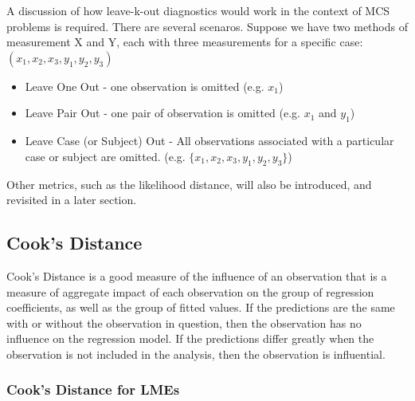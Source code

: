 \documentclass[12pt, a4paper]{report}
\theoremstyle{plain}
\theoremstyle{definition}
\theoremstyle{remark}
\begin{document}
A discussion of how leave-k-out diagnostics would work in the context of MCS problems is required. There are several scenaros. Suppose we have two methods of measurement X and Y, each with three measurements for a specific case: $(x_1,x_2,x_3,y_1,y_2,y_3)$
	
	\begin{itemize}
		\item Leave One Out - one observation is omitted (e.g. $x_1$)
		\item Leave Pair Out - one pair of observation  is omitted (e.g. $x_1$ and $y_1$)
		\item Leave Case (or Subject) Out - All observations associated with a particular case or subject are omitted. (e.g. $\{x_1,x_2,x_3,y_1,y_2,y_3\}$)
	\end{itemize}
	Other metrics, such as the likelihood distance, will also be introduced, and revisited in a later section.
	
	


	\subsection{Cook's Distance}
	
	Cook's Distance is a good measure of the influence of an observation that is a measure of aggregate impact of each observation on the group of regression coefficients, as well as the group of fitted values.
	If the predictions are the same with or without the observation in question, then the observation has no influence on the regression model. If the predictions differ greatly when the observation is not included in the analysis, then the observation is influential.
	
	
\subsubsection{Cook's Distance for LMEs} %
	
\end{document}

